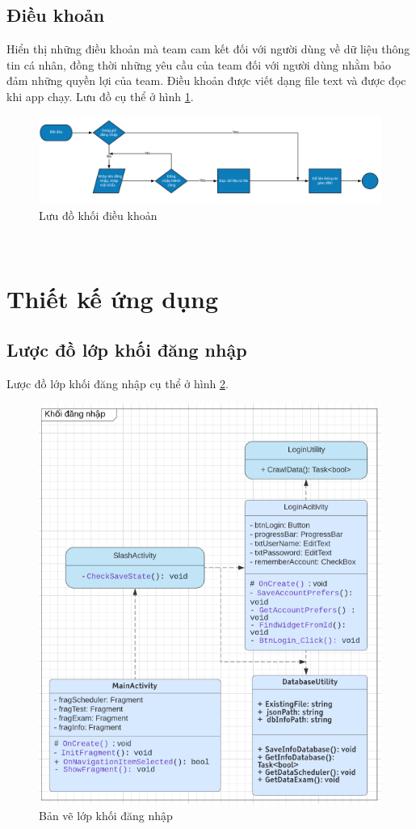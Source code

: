 \documentclass[a4paper]{article}
\begin{document}
\subsection{Điều khoản}
    Hiển thị những điều khoản mà team cam kết đối với người dùng về dữ liệu thông tin cá nhân, đồng thời những yêu cầu của team đối với người dùng nhằm bảo đảm những quyền lợi của team. Điều khoản được viết dạng file text và được đọc khi app chạy. Lưu đồ cụ thể ở hình \ref{dieukhoan}.
\begin{figure}[h!]
    \centering
    \includegraphics[scale=.4]{dieukhoan.PNG}
    \caption{Lưu đồ khối điều khoản}
    \label{dieukhoan}
\end{figure}\\
\section{Thiết kế ứng dụng}
\subsection{Lược đồ lớp khối đăng nhập}
Lược đồ lớp khối đăng nhập cụ thể ở hình \ref{fig:uml_login}.
\begin{figure}[H]
    \centering
    \includegraphics[scale = .5]{uml_login.png}
    \caption{Bản vẽ lớp khối đăng nhập}
    \label{fig:uml_login}
\end{figure}
\end{document}
